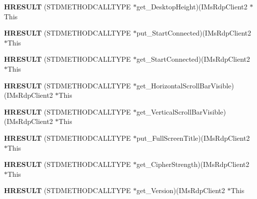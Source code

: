 \begin{DoxyCompactItemize}
{\bfseries H\+R\+E\+S\+U\+LT} (S\+T\+D\+M\+E\+T\+H\+O\+D\+C\+A\+L\+L\+T\+Y\+PE $\ast$get\+\_\+\+Desktop\+Height)(I\+Ms\+Rdp\+Client2 $\ast$This
\item 
\mbox{\label{struct_i_ms_rdp_client2_vtbl_a1d9e1a82b26cd718053835aa1af6c123}} 
{\bfseries H\+R\+E\+S\+U\+LT} (S\+T\+D\+M\+E\+T\+H\+O\+D\+C\+A\+L\+L\+T\+Y\+PE $\ast$put\+\_\+\+Start\+Connected)(I\+Ms\+Rdp\+Client2 $\ast$This
\item 
\mbox{\label{struct_i_ms_rdp_client2_vtbl_a716b0d9e1cebcc511bdd25469fe70998}} 
{\bfseries H\+R\+E\+S\+U\+LT} (S\+T\+D\+M\+E\+T\+H\+O\+D\+C\+A\+L\+L\+T\+Y\+PE $\ast$get\+\_\+\+Start\+Connected)(I\+Ms\+Rdp\+Client2 $\ast$This
\item 
\mbox{\label{struct_i_ms_rdp_client2_vtbl_ac34b7caff15da89529b34f9c7a3e2465}} 
{\bfseries H\+R\+E\+S\+U\+LT} (S\+T\+D\+M\+E\+T\+H\+O\+D\+C\+A\+L\+L\+T\+Y\+PE $\ast$get\+\_\+\+Horizontal\+Scroll\+Bar\+Visible)(I\+Ms\+Rdp\+Client2 $\ast$This
\item 
\mbox{\label{struct_i_ms_rdp_client2_vtbl_a881f741f6ed392fbf42d3d8e248e8169}} 
{\bfseries H\+R\+E\+S\+U\+LT} (S\+T\+D\+M\+E\+T\+H\+O\+D\+C\+A\+L\+L\+T\+Y\+PE $\ast$get\+\_\+\+Vertical\+Scroll\+Bar\+Visible)(I\+Ms\+Rdp\+Client2 $\ast$This
\item 
\mbox{\label{struct_i_ms_rdp_client2_vtbl_a4743b0616b856ad329012228ca95b53f}} 
{\bfseries H\+R\+E\+S\+U\+LT} (S\+T\+D\+M\+E\+T\+H\+O\+D\+C\+A\+L\+L\+T\+Y\+PE $\ast$put\+\_\+\+Full\+Screen\+Title)(I\+Ms\+Rdp\+Client2 $\ast$This
\item 
\mbox{\label{struct_i_ms_rdp_client2_vtbl_aff299b65596aeadbd1a25e961a7cdc47}} 
{\bfseries H\+R\+E\+S\+U\+LT} (S\+T\+D\+M\+E\+T\+H\+O\+D\+C\+A\+L\+L\+T\+Y\+PE $\ast$get\+\_\+\+Cipher\+Strength)(I\+Ms\+Rdp\+Client2 $\ast$This
\item 
\mbox{\label{struct_i_ms_rdp_client2_vtbl_a4ebfc89066bbb21544760ecf44173cd8}} 
{\bfseries H\+R\+E\+S\+U\+LT} (S\+T\+D\+M\+E\+T\+H\+O\+D\+C\+A\+L\+L\+T\+Y\+PE $\ast$get\+\_\+\+Version)(I\+Ms\+Rdp\+Client2 $\ast$This
\item 

\end{DoxyCompactItemize}
